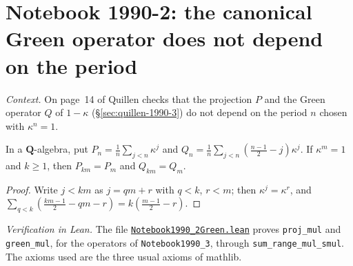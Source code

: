 \section[Notebook 1990-2: the Green operator does not depend on the period]{Notebook 1990-2: the canonical Green operator does not depend on the period\protect{}}\label{sec:quillen-1990-2-green}

\emph{Context.} On page~14 of  Quillen checks that the projection $P$ and the Green operator $Q$ of $1 - \kappa$ (\S\ref{sec:quillen-1990-3}) do not depend on the period $n$ chosen with $\kappa^n = 1$.

\begin{encadre}
\begin{theoreme}\label{thm:quillen-1990-2-green}
In a $\mathbf Q$-algebra, put $P_n = \frac1n\sum_{j<n}\kappa^j$ and $Q_n = \frac1n\sum_{j<n}(\frac{n-1}2 - j)\kappa^j$. If $\kappa^m = 1$ and $k \ge 1$, then $P_{km} = P_m$ and $Q_{km} = Q_m$.
\end{theoreme}
\end{encadre}

\begin{proof}
Write $j < km$ as $j = qm + r$ with $q < k$, $r < m$; then $\kappa^j = \kappa^r$, and $\sum_{q<k}(\frac{km-1}2 - qm - r) = k(\frac{m-1}2 - r)$.
\end{proof}

\emph{Verification in Lean.} The file \href{\leanblobmain/Notebook1990_2Green.lean}{\texttt{Notebook1990\_2Green.\allowbreak{}lean}} proves \texttt{proj\_mul} and \texttt{green\_mul}, for the operators of \texttt{Notebook1990\_3}, through \texttt{sum\_range\_mul\_smul}. The axioms used are the three usual axioms of mathlib.

